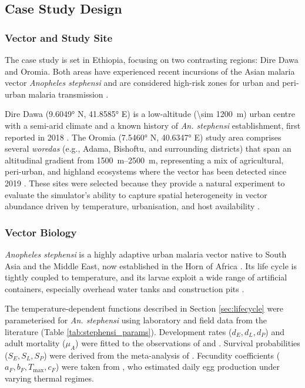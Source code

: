 \documentclass{article}
\begin{document}
\subsection{Case Study Design}
\label{sec:case_study}
\subsubsection{Vector and Study Site}
\par
The case study is set in Ethiopia, focusing on two contrasting regions: Dire Dawa and Oromia. 
Both areas have experienced recent incursions of the Asian malaria vector \textit{Anopheles stephensi} and are 
considered high-risk zones for urban and peri-urban malaria transmission \citep{2020.MB.GDO, 2021.MB.AUO, 2023.DH.FRO}.
\par
Dire Dawa (\ang{9.6049} N, \ang{41.8585} E) is a low-altitude (\SI{\sim 1200}{\meter}) urban centre with a semi-arid climate and a known 
history of \textit{An. stephensi} establishment, first reported in 2018 \citep{2020.MB.GDO}. The Oromia (\ang{7.5460} N, \ang{40.6347} E) 
study area comprises several \textit{woredas} (e.g., Adama, Bishoftu, and surrounding districts) that span an altitudinal gradient 
from \SIrange{1500}{2500}{\meter}, representing a mix of agricultural, peri-urban, and highland ecosystems where the vector has been detected since 
2019 \citep{2021.MB.AUO, 2024.TA.SDA}. These sites were selected because they provide a natural experiment to evaluate the simulator's 
ability to capture spatial heterogeneity in vector abundance driven by temperature, urbanisation, and host availability 
\citep{2025.TD.BOA, 2024.GZ.ROC}.

\subsubsection{Vector Biology}

\textit{Anopheles stephensi} is a highly adaptive urban malaria vector native to South Asia and the Middle East, now established 
in the Horn of Africa \citep{2024.RT.IAS}. Its life cycle is tightly coupled to temperature, and its larvae exploit a wide range 
of artificial containers, especially overhead water tanks and construction pits \citep{2016.ST.OTI}. 

The temperature-dependent functions described in Section \ref{sec:lifecycle} were parameterised for \textit{An. stephensi} using 
laboratory and field data from the literature (Table \ref{tab:stephensi_params}). Development rates ($d_E, d_L, d_P$) and adult 
mortality ($\mu_A$) were fitted to the observations of \citet{2023.JJ.BBA} and \citet{2025.CG.EOT}. Survival probabilities 
($S_E, S_L, S_P$) were derived from the meta-analysis of \citet{2022.OC.TIT}. Fecundity coefficients ($a_F, b_F, T_{\max}, c_F$) 
were taken from \citet{2023.JJ.BBA}, who estimated daily egg production under varying thermal regimes. 
\end{document}
